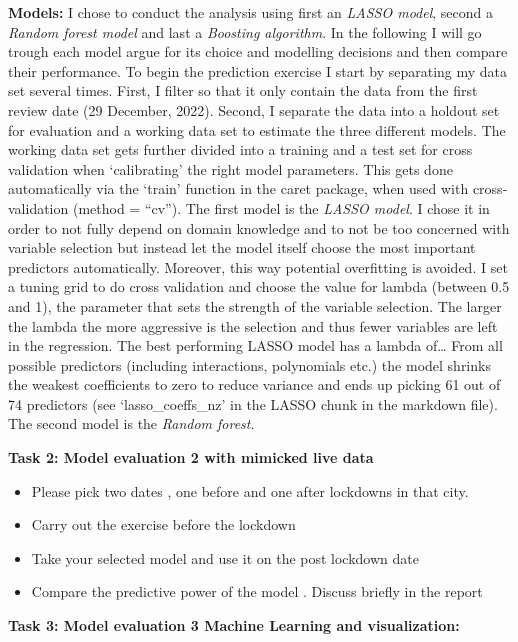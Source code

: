 \documentclass[
]{article}
\providecommand{\tightlist}{%
  \setlength{\itemsep}{0pt}\setlength{\parskip}{0pt}}
\begin{document}
\textbf{Models:} I chose to conduct the analysis using first an
\emph{LASSO model}, second a \emph{Random forest model} and last a
\emph{Boosting algorithm}. In the following I will go trough each model
argue for its choice and modelling decisions and then compare their
performance. To begin the prediction exercise I start by separating my
data set several times. First, I filter so that it only contain the data
from the first review date (29 December, 2022). Second, I separate the
data into a holdout set for evaluation and a working data set to
estimate the three different models. The working data set gets further
divided into a training and a test set for cross validation when
`calibrating' the right model parameters. This gets done automatically
via the `train' function in the caret package, when used with
cross-validation (method = ``cv''). The first model is the \emph{LASSO
model}. I chose it in order to not fully depend on domain knowledge and
to not be too concerned with variable selection but instead let the
model itself choose the most important predictors automatically.
Moreover, this way potential overfitting is avoided. I set a tuning grid
to do cross validation and choose the value for lambda (between 0.5 and
1), the parameter that sets the strength of the variable selection. The
larger the lambda the more aggressive is the selection and thus fewer
variables are left in the regression. The best performing LASSO model
has a lambda of\ldots{} From all possible predictors (including
interactions, polynomials etc.) the model shrinks the weakest
coefficients to zero to reduce variance and ends up picking 61 out of 74
predictors (see `lasso\_coeffs\_nz' in the LASSO chunk in the markdown
file). The second model is the \emph{Random forest}.

\textbf{Task 2: Model evaluation 2 with mimicked live data}

\begin{itemize}
\tightlist
\item
  Please pick two dates , one before and one after lockdowns in that
  city.
\item
  Carry out the exercise before the lockdown
\item
  Take your selected model and use it on the post lockdown date
\item
  Compare the predictive power of the model . Discuss briefly in the
  report
\end{itemize}

\textbf{Task 3: Model evaluation 3 Machine Learning and visualization:}
\end{document}
